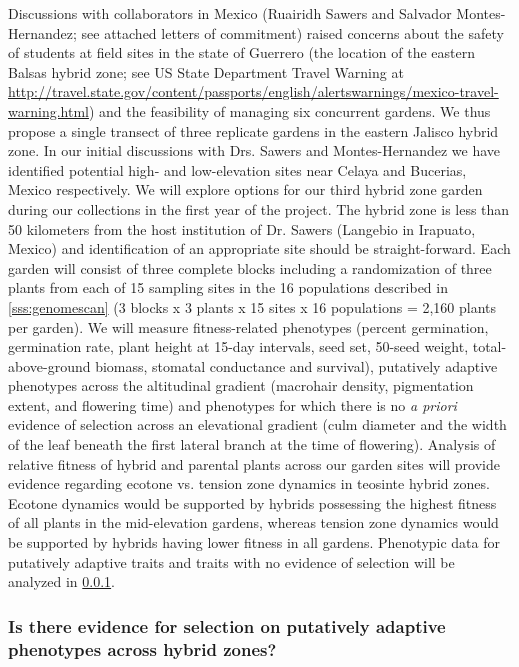 Discussions with collaborators in Mexico (Ruairidh Sawers and Salvador Montes-Hernandez; see attached letters of commitment) raised concerns about the safety of students at field sites in the state of Guerrero (the location of the eastern Balsas hybrid zone; see US State Department Travel Warning at \url{http://travel.state.gov/content/passports/english/alertswarnings/mexico-travel-warning.html}) and the feasibility of managing six concurrent gardens. We thus propose a single transect of three replicate gardens in the eastern Jalisco hybrid zone. 
In our initial discussions with Drs. Sawers and Montes-Hernandez we have identified potential high- and low-elevation sites near Celaya and Bucerias, Mexico respectively.  
We will explore options for our third hybrid zone garden during our collections in the first year of the project.
The hybrid zone is less than 50 kilometers from the host institution of Dr. Sawers (Langebio in Irapuato, Mexico) and identification of an appropriate site should be straight-forward.
Each garden will consist of three complete blocks including a randomization of three plants from each of 15 sampling sites in the 16 populations described in \ref{sss:genomescan} (3 blocks x 3 plants x 15 sites x 16 populations = 2,160 plants per garden).  
We will measure fitness-related phenotypes (percent germination, germination rate, plant height at 15-day intervals, seed set, 50-seed weight, total-above-ground biomass, stomatal conductance and survival), putatively adaptive phenotypes across the altitudinal gradient (macrohair density, pigmentation extent, and flowering time) and phenotypes for which there is no \emph{a priori} evidence of selection across an elevational gradient (culm diameter  and the width of the leaf beneath the first lateral branch at the time of flowering).  
Analysis of relative fitness of hybrid and parental plants across our garden sites will provide evidence regarding ecotone vs. tension zone dynamics in teosinte hybrid zones.  Ecotone dynamics would be supported by hybrids possessing the highest fitness of all plants in the mid-elevation gardens, whereas tension zone dynamics would be supported by hybrids having lower fitness in all gardens.  Phenotypic data for putatively adaptive traits and traits with no evidence of selection will be analyzed in \ref{sss:driftsel}.   

\subsubsection{Is there evidence for selection on putatively adaptive phenotypes across hybrid zones?}
\label{sss:driftsel}

